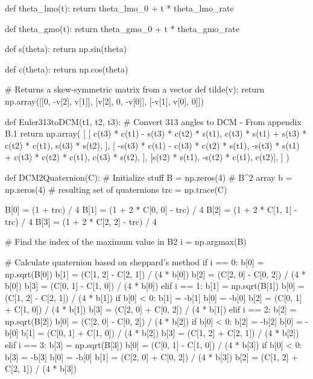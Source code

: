 \documentclass[conf]{new-aiaa}
\begin{document}
\begin{pythoncode}
def theta_lmo(t):
    return theta_lmo_0 + t * theta_lmo_rate


def theta_gmo(t):
    return theta_gmo_0 + t * theta_gmo_rate


def s(theta):
    return np.sin(theta)


def c(theta):
    return np.cos(theta)


# Returns a skew-symmetric matrix from a vector
def tilde(v):
    return np.array([[0, -v[2], v[1]], [v[2], 0, -v[0]], [-v[1], v[0], 0]])


def Euler313toDCM(t1, t2, t3):
    # Convert 313 angles to DCM - From appendix B.1
    return np.array(
        [
            [
                c(t3) * c(t1) - s(t3) * c(t2) * s(t1),
                c(t3) * s(t1) + s(t3) * c(t2) * c(t1),
                s(t3) * s(t2),
            ],
            [
                -s(t3) * c(t1) - c(t3) * c(t2) * s(t1),
                -s(t3) * s(t1) + c(t3) * c(t2) * c(t1),
                c(t3) * s(t2),
            ],
            [s(t2) * s(t1), -s(t2) * c(t1), c(t2)],
        ]
    )


def DCM2Quaternion(C):
    # Initialize stuff
    B = np.zeros(4)  # B^2 array
    b = np.zeros(4)  # resulting set of quaternions
    trc = np.trace(C)

    B[0] = (1 + trc) / 4
    B[1] = (1 + 2 * C[0, 0] - trc) / 4
    B[2] = (1 + 2 * C[1, 1] - trc) / 4
    B[3] = (1 + 2 * C[2, 2] - trc) / 4

    # Find the index of the maximum value in B2
    i = np.argmax(B)

    # Calculate quaternion based on sheppard's method
    if i == 0:
        b[0] = np.sqrt(B[0])
        b[1] = (C[1, 2] - C[2, 1]) / (4 * b[0])
        b[2] = (C[2, 0] - C[0, 2]) / (4 * b[0])
        b[3] = (C[0, 1] - C[1, 0]) / (4 * b[0])
    elif i == 1:
        b[1] = np.sqrt(B[1])
        b[0] = (C[1, 2] - C[2, 1]) / (4 * b[1])
        if b[0] < 0:
            b[1] = -b[1]
            b[0] = -b[0]
        b[2] = (C[0, 1] + C[1, 0]) / (4 * b[1])
        b[3] = (C[2, 0] + C[0, 2]) / (4 * b[1])
    elif i == 2:
        b[2] = np.sqrt(B[2])
        b[0] = (C[2, 0] - C[0, 2]) / (4 * b[2])
        if b[0] < 0:
            b[2] = -b[2]
            b[0] = -b[0]
        b[1] = (C[0, 1] + C[1, 0]) / (4 * b[2])
        b[3] = (C[1, 2] + C[2, 1]) / (4 * b[2])
    elif i == 3:
        b[3] = np.sqrt(B[3])
        b[0] = (C[0, 1] - C[1, 0]) / (4 * b[3])
        if b[0] < 0:
            b[3] = -b[3]
            b[0] = -b[0]
        b[1] = (C[2, 0] + C[0, 2]) / (4 * b[3])
        b[2] = (C[1, 2] + C[2, 1]) / (4 * b[3])


\end{pythoncode}
\end{document}
